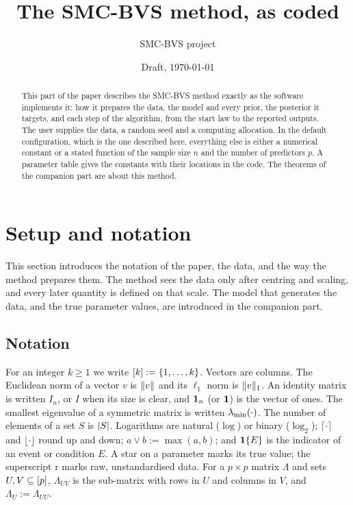 \documentclass[11pt]{article}
\title{The SMC-BVS method, as coded}
\author{SMC-BVS project}
\date{Draft, \today}
\begin{document}
\maketitle

\begin{abstract}
\noindent
This part of the paper describes the SMC-BVS method exactly as the software implements it: how it prepares the data, the
model and every prior, the posterior it targets, and each step of the algorithm, from the start law to the reported
outputs. The user supplies the data, a random seed and a computing allocation. In the default configuration, which is the
one described here, everything else is either a numerical constant or a stated function of the sample size $n$ and the
number of predictors $p$. A parameter table gives the constants with their locations in the code. The theorems of the companion
part are about this method.
\end{abstract}

\section{Setup and notation}\label{sec:m-setup}

This section introduces the notation of the paper, the data, and the way the method prepares them. The method sees the
data only after centring and scaling, and every later quantity is defined on that scale. The model that generates the
data, and the true parameter values, are introduced in the companion part.

\subsection{Notation}\label{sec:m-notation}

For an integer $k\ge1$ we write $[k]:=\{1,\dots,k\}$. Vectors are columns. The Euclidean norm of a vector $v$ is
$\lVert v\rVert$ and its $\ell_1$ norm is $\lVert v\rVert_1$. An identity matrix is written $I_n$, or $I$ when its size is clear,
and $\mathbf{1}_n$ (or $\mathbf{1}$) is the vector of ones. The smallest eigenvalue of a symmetric matrix is written $\lambda_{\min}(\cdot)$.
The number of elements of a set $S$ is $\lvert S\rvert$. Logarithms are natural ($\log$) or binary ($\log_2$);
$\lceil\cdot\rceil$ and $\lfloor\cdot\rfloor$ round up and down; $a\vee b:=\max(a,b)$; and $\mathbf{1}\{E\}$ is the indicator of
an event or condition $E$. A star on a parameter marks its true value; the superscript $\mathrm r$ marks raw,
unstandardised data. For a $p\times p$ matrix $\Lambda$ and sets $U,V\subseteq[p]$, $\Lambda_{UV}$ is the sub-matrix
with rows in $U$ and columns in $V$, and $\Lambda_U:=\Lambda_{UU}$.
\end{document}
